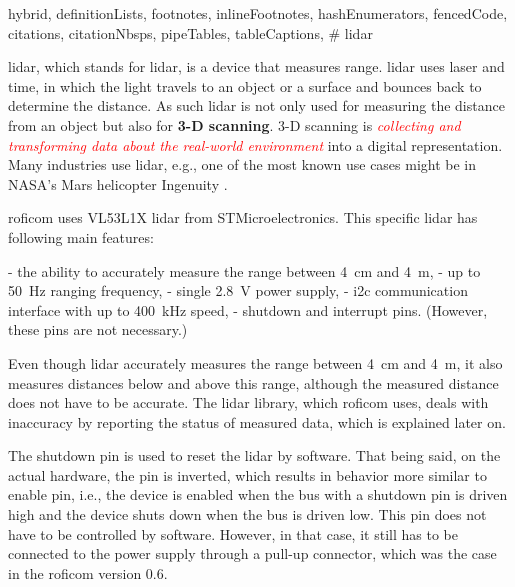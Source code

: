 \documentclass[
  digital,     %
  oneside,     %
  nosansbold,  %
  nocolorbold, %
  nolof,         %
  nolot,         %
]{fithesis4}
\newcommand{\TODO}[1]{\textcolor{red}{\textit{#1}}}
\begin{document}
\begin{markdown*}{%
  hybrid,
  definitionLists,
  footnotes,
  inlineFootnotes,
  hashEnumerators,
  fencedCode,
  citations,
  citationNbsps,
  pipeTables,
  tableCaptions,
}
# \texorpdfstring{ \acrshort{lidar} }{LiDAR} \label{lidar}

\acrshort{lidar}, which stands for \acrlong{lidar}, is a device that measures range. \acrshort{lidar} uses laser and time, in which the light travels to an object or a surface and bounces back to determine the distance. As such \acrshort{lidar} is not only used for measuring the distance from an object but also for \textbf{3-D scanning}. 3-D scanning is \TODO{collecting and transforming data about the real-world environment} into a digital representation. Many industries use \acrshort{lidar}, e.g., one of the most known use cases might be in NASA's Mars helicopter Ingenuity \cite{garmin-lidar}.

\acrshort{roficom} uses VL53L1X \acrshort{lidar} from STMicroelectronics. This specific \acrshort{lidar} has following main features:

- the ability to accurately measure the range between \qty{4}{\centi\metre} and \qty{4}{\metre},
- up to \qty{50}{\hertz} ranging frequency,
- single \qty{2.8}{\volt} power supply,
- \acrshort{i2c} communication interface with up to \qty{400}{\kilo\hertz} speed,
- shutdown and interrupt pins. (However, these pins are not necessary.)

Even though \acrshort{lidar} accurately measures the range between \qty{4}{\centi\metre} and \qty{4}{\metre}, it also measures distances below and above this range, although the measured distance does not have to be accurate. The lidar library, which \acrshort{roficom} uses, deals with inaccuracy by reporting the status of measured data, which is explained later on.

The shutdown pin is used to reset the \acrshort{lidar} by software. That being said, on the actual hardware, the pin is inverted, which results in behavior more similar to enable pin, i.e., the device is enabled when the bus with a shutdown pin is driven high and the device shuts down when the bus is driven low. This pin does not have to be controlled by software. However, in that case, it still has to be connected to the power supply through a pull-up connector, which was the case in the \acrshort{roficom} version 0.6.


\end{markdown*}
\end{document}
